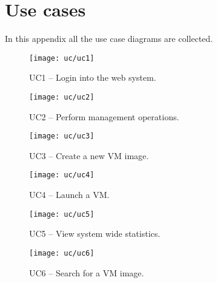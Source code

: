 \chapter{Use cases} \label{chap:ap5}

In this appendix all the use case diagrams are collected.


\begin{figure}[h]
  \begin{center}
    \leavevmode
    \texttt{[image: uc/uc1]}
    \caption{UC1 -- Login into the web system.}
    \label{fig:uc1}
  \end{center}
\end{figure}

\begin{figure}[h]
  \begin{center}
    \leavevmode
    \texttt{[image: uc/uc2]}
    \caption{UC2 -- Perform management operations.}
    \label{fig:uc2}
  \end{center}
\end{figure}


\begin{figure}[h]
  \begin{center}
    \leavevmode
    \texttt{[image: uc/uc3]}
    \caption{UC3 -- Create a new VM image.}
    \label{fig:uc3}
  \end{center}
\end{figure}

\begin{figure}[h]
  \begin{center}
    \leavevmode
    \texttt{[image: uc/uc4]}
    \caption{UC4 -- Launch a VM.}
    \label{fig:uc4}
  \end{center}
\end{figure}

\begin{figure}[h]
  \begin{center}
    \leavevmode
    \texttt{[image: uc/uc5]}
    \caption{UC5 -- View system wide statistics.}
    \label{fig:uc5}
  \end{center}
\end{figure}

\begin{figure}[h]
  \begin{center}
    \leavevmode
    \texttt{[image: uc/uc6]}
    \caption{UC6 -- Search for a VM image.}
    \label{fig:uc6}
  \end{center}
\end{figure}

